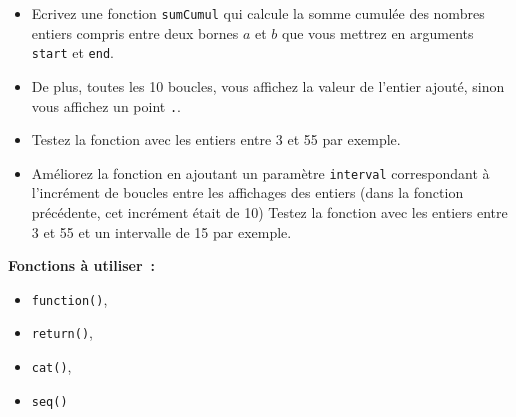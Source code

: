 \documentclass[
]{article}
\providecommand{\tightlist}{%
  \setlength{\itemsep}{0pt}\setlength{\parskip}{0pt}}
\begin{document}
\begin{itemize}
\item
  Ecrivez une fonction \texttt{sumCumul} qui calcule la somme cumulée
  des nombres entiers compris entre deux bornes \(a\) et \(b\) que vous
  mettrez en arguments \texttt{start} et \texttt{end}.
\item
  De plus, toutes les 10 boucles, vous affichez la valeur de l'entier
  ajouté, sinon vous affichez un point \texttt{.}.
\item
  Testez la fonction avec les entiers entre 3 et 55 par exemple.
\item
  Améliorez la fonction en ajoutant un paramètre \texttt{interval}
  correspondant à l'incrément de boucles entre les affichages des
  entiers (dans la fonction précédente, cet incrément était de 10)
  Testez la fonction avec les entiers entre 3 et 55 et un intervalle de
  15 par exemple.
\end{itemize}

\textbf{Fonctions à utiliser~:}

\begin{itemize}
\tightlist
\item
  \texttt{function()},
\item
  \texttt{return()},
\item
  \texttt{cat()},
\item
  \texttt{seq()}
\end{itemize}
\end{document}
